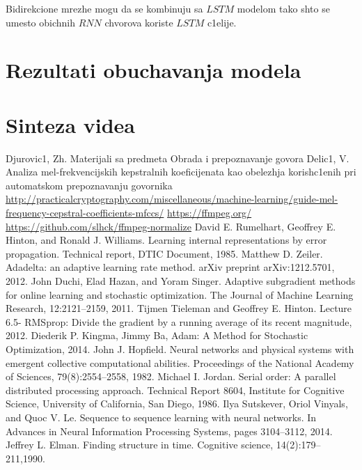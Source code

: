 \documentclass[a4paper, openany, oneside, 11pt]{book}
\begin{document}
Bidirekcione mrezhe mogu da se kombinuju sa $LSTM$ modelom tako shto se umesto obichnih $RNN$ chvorova koriste $LSTM$ c1elije.
\chapter{Rezultati obuchavanja modela}

\chapter{Sinteza videa}


\begin{thebibliography}{99}

Djurovic1, Zh. Materijali sa predmeta Obrada i prepoznavanje govora
Delic1, V. Analiza mel-frekvencijskih kepstralnih koeficijenata kao obelezhja korish\-c1enih pri automat\-skom prepoznavanju govornika
\selectfont
\url{http://practicalcryptography.com/miscellaneous/machine-learning/guide-mel-frequency-cepstral-coefficients-mfccs/}
\url{https://ffmpeg.org/}
\url{https://github.com/slhck/ffmpeg-normalize}
David E. Rumelhart, Geoffrey E. Hinton, and Ronald J. Williams. Learning
internal representations by error propagation. Technical report, DTIC Document, 1985.
Matthew D. Zeiler. Adadelta: an adaptive learning rate method. arXiv preprint arXiv:1212.5701, 2012.
John Duchi, Elad Hazan, and Yoram Singer. Adaptive subgradient methods for
online learning and stochastic optimization. The Journal of Machine Learning Research, 12:2121–2159, 2011.
Tijmen Tieleman and Geoffrey E. Hinton. Lecture 6.5- RMSprop: Divide
the gradient by a running average of its recent magnitude, 2012.
Diederik P. Kingma, Jimmy Ba, Adam: A Method for Stochastic Optimization, 2014.
John J. Hopfield. Neural networks and physical systems with emergent collective
computational abilities. Proceedings of the National Academy of Sciences, 79(8):2554–2558, 1982.
Michael I. Jordan. Serial order: A parallel distributed processing approach.
Technical Report 8604, Institute for Cognitive Science, University of California, San Diego, 1986.
Ilya Sutskever, Oriol Vinyals, and Quoc V. Le. Sequence to sequence learning
with neural networks. In Advances in Neural Information Processing Systems,
pages 3104–3112, 2014.
Jeffrey L. Elman. Finding structure in time. Cognitive science, 14(2):179–211,1990.

\end{thebibliography}
\end{document}
